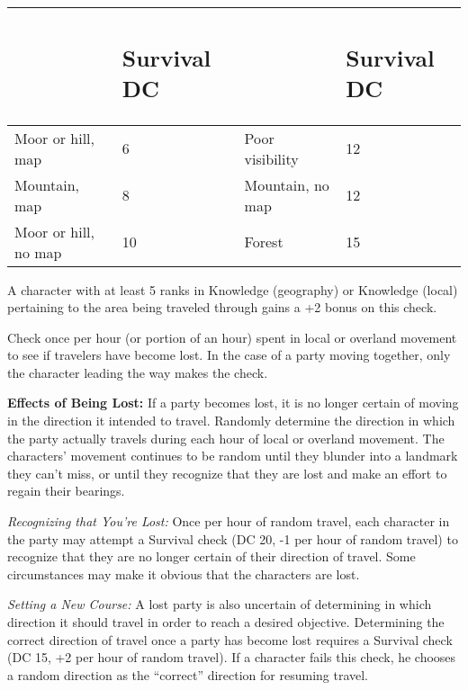 \documentclass{article}
\begin{document}
\begin{tabular}{|>{\raggedright}p{82pt}|>{\raggedright}p{51pt}|>{\raggedright}p{72pt}|>{\raggedright}p{51pt}|}
\hline
\subsection*{ } & \subsection*{S\textbf{urvival DC}} & \subsection*{ } & \subsection*{S\textbf{urvival 
DC}}\tabularnewline
\hline
Moor or hill, map & 6 & Poor visibility & 12\tabularnewline
\hline
Mountain, map & 8 & Mountain, no map & 12\tabularnewline
\hline
Moor or hill, no map & 10 & Forest & 15\tabularnewline
\hline
\end{tabular}

A character with at least 5 ranks in Knowledge (geography) or Knowledge (local) 
pertaining to the area being traveled through gains a +2 bonus on this check.

Check once per hour (or portion of an hour) spent in local or overland movement 
to see if travelers have become lost. In the case of a party moving together, only 
the character leading the way makes the check.

\textbf{Effects of Being Lost:} If a party becomes lost, it is no longer certain 
of moving in the direction it intended to travel. Randomly determine the direction 
in which the party actually travels during each hour of local or overland movement. 
The characters' movement continues to be random until they blunder into a landmark 
they can't miss, or until they recognize that they are lost and make an effort 
to regain their bearings.

\textit{Recognizing that You're Lost:} Once per hour of random travel, each character 
in the party may attempt a Survival check (DC 20, -1 per hour of random travel) 
to recognize that they are no longer certain of their direction of travel. Some 
circumstances may make it obvious that the characters are lost.

\textit{Setting a New Course: }A lost party is also uncertain of determining in 
which direction it should travel in order to reach a desired objective. Determining 
the correct direction of travel once a party has become lost requires a Survival 
check (DC 15, +2 per hour of random travel). If a character fails this check, he 
chooses a random direction as the ``correct'' direction for resuming travel.
\end{document}
